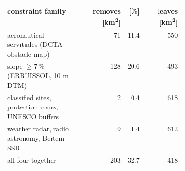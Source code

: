 \begin{tabular}{p{0.42\linewidth}rrr}
\toprule
constraint family & removes [\si{\square\kilo\metre}] & [\%] & leaves [\si{\square\kilo\metre}] \\
\midrule
aeronautical servitudes (DGTA obstacle map) & 71 & 11.4 & 550 \\
slope $\geq 7\,\%$ (ERRUISSOL, 10 m DTM) & 128 & 20.6 & 493 \\
classified sites, protection zones, UNESCO buffers & 2 & 0.4 & 618 \\
weather radar, radio astronomy, Bertem SSR & 9 & 1.4 & 612 \\
\midrule
all four together & 203 & 32.7 & 418 \\
\bottomrule
\end{tabular}